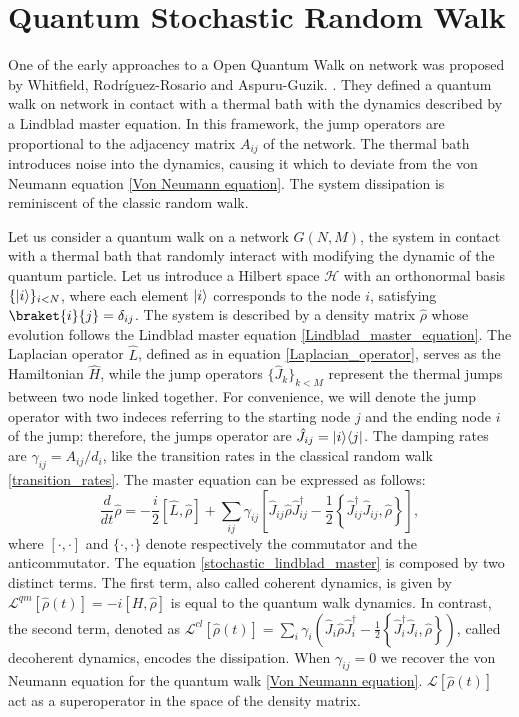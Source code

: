 \section{Quantum Stochastic Random Walk}\label{C_Quantum Stochastic Walk}

One of the early approaches to a Open Quantum Walk on network was proposed by Whitfield, Rodr\'iguez-Rosario and Aspuru-Guzik. \cite{QSW}. They defined a quantum walk on network in contact with a thermal bath with the dynamics described by a Lindblad master equation. In this framework, the jump operators are proportional to the adjacency  matrix $A_{ij}$ of the network. The thermal bath introduces noise into the dynamics, causing it which to deviate from the  von Neumann equation \eqref{Von Neumann equation}. The system dissipation is reminiscent of the classic random walk.

Let us consider a quantum walk on a network $G(N,M)$, the system in contact with a thermal bath that randomly interact with modifying the dynamic of the quantum particle.
Let us introduce a Hilbert space $\mathcal{H}$ with an orthonormal basis $\{\lvert i\rangle\}_{i<N}$, where each element $\lvert i\rangle$ corresponds to the node $i$, satisfying $\braket{i}{j}=\delta_{ij}$. The system is described by a density matrix $\hat \rho$ whose evolution follows the Lindblad master equation \eqref{Lindblad_master_equation}.
The Laplacian operator $\hat L$, defined as in equation \eqref{Laplacian_operator}, serves as the Hamiltonian $\hat H$, while the jump operators $\{\hat J_k\}_{k<M}$ represent the thermal jumps between two node linked together. For convenience, we will denote the jump operator with two indeces referring to the starting node $j$ and the ending node $i$ of the jump: therefore, the jumps operator are $\hat J_{ij} = \lvert i\rangle\langle j\rvert$. The damping rates are $\gamma_{ij} =A_{ij}/d_i$, like the transition rates in the classical random walk \eqref{transition_rates}.
The master equation can be expressed as follows:
\begin{equation}\label{stochastic_lindblad_master}
    \frac{d}{dt}\hat \rho = -\frac{i}{2}\left[\hat L,\hat\rho\right] + \sum_{ij}\gamma_{ij}\left[\hat J_{ij} \hat\rho\hat J_{ij}^\dagger -\frac{1}{2} \left\{ \hat J_{ij}^\dagger \hat J_{ij}, \hat\rho\right\}\right],
\end{equation}
where $[\cdot,\cdot]$ and $\{\cdot,\cdot\}$ denote respectively the commutator and the anticommutator.
The equation \eqref{stochastic_lindblad_master} is composed by two distinct terms. The first term, also called coherent dynamics,  is given by
$\mathcal{L}^{qm}\left[\hat\rho(t)\right] = -i\left[H,\hat\rho\right]$ is equal to the quantum walk dynamics. In contrast, the second term, denoted as $\mathcal{L}^{cl}\left[\hat\rho(t)\right] = \sum_i \gamma_i \left(\hat J_i \hat\rho \hat J^\dagger_i - \frac{1}{2}\left\{ \hat J^\dagger_i\hat J_i, \hat\rho\right\} \right)$, called decoherent dynamics, encodes the dissipation. 
When $\gamma_{ij} = 0$ we recover the von Neumann equation for the quantum walk \eqref{Von Neumann equation}. 
$\mathcal{L}\left[\hat\rho(t)\right]$ act as a superoperator in the space of the density matrix.

